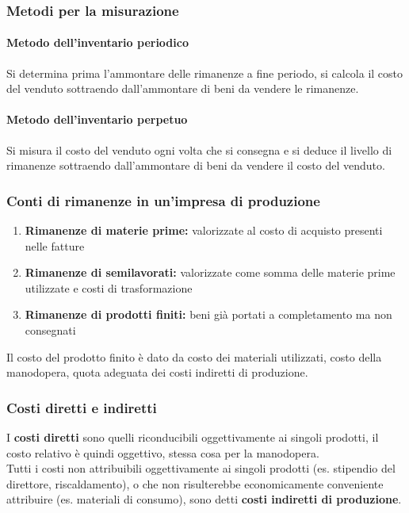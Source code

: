 \documentclass{report}
\begin{document}
	\subsubsection{Metodi per la misurazione}
	\paragraph{Metodo dell'inventario periodico} Si determina prima l'ammontare delle rimanenze a fine periodo, si calcola il costo del venduto sottraendo dall'ammontare di beni da vendere le rimanenze.
	\paragraph{Metodo dell'inventario perpetuo} Si misura il costo del venduto ogni volta che si consegna e si deduce il livello di rimanenze sottraendo dall'ammontare di beni da vendere il costo del venduto.
	\subsubsection{Conti di rimanenze in un'impresa di produzione}
	\begin{enumerate}
		\item \textbf{Rimanenze di materie prime:} valorizzate al costo di acquisto presenti nelle fatture
		\item \textbf{Rimanenze di semilavorati:} valorizzate come somma delle materie prime utilizzate e costi di trasformazione
		\item \textbf{Rimanenze di prodotti finiti:} beni già portati a completamento ma non consegnati
	\end{enumerate}
	Il costo del prodotto finito è dato da costo dei materiali utilizzati, costo della manodopera, quota adeguata dei costi indiretti di produzione.
	\subsubsection{Costi diretti e indiretti}
	I \textbf{costi diretti} sono quelli riconducibili oggettivamente ai singoli prodotti, il costo relativo è quindi oggettivo, stessa cosa per la manodopera.
	\medskip \\
	Tutti i costi non attribuibili oggettivamente ai singoli prodotti (es. stipendio del direttore, riscaldamento), o che non risulterebbe economicamente conveniente attribuire (es. materiali di consumo), sono detti \textbf{costi indiretti di produzione}.
\end{document}
